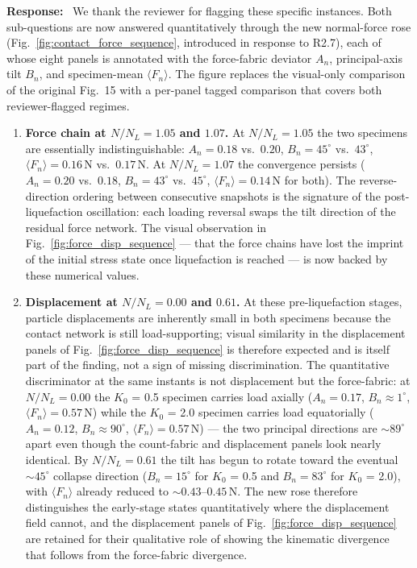 \documentclass[11pt,a4paper]{article}
\newcommand{\response}{\par\noindent\textbf{Response:}\ \ignorespaces}
\newcommand{\Kzero}{\ensuremath{K_0}}
\begin{document}
\response
We thank the reviewer for flagging these specific instances. Both
sub-questions are now answered quantitatively through the new
normal-force rose (Fig.~\ref{fig:contact_force_sequence}, introduced
in response to R2.7), each of whose eight panels is annotated with
the force-fabric deviator
$A_n$, principal-axis tilt $B_n$, and specimen-mean
$\langle F_n\rangle$. The figure replaces the visual-only comparison
of the original Fig.~15 with a per-panel tagged comparison that
covers both reviewer-flagged regimes.

\begin{enumerate}[leftmargin=*,label=(\arabic*),topsep=4pt,itemsep=6pt]
\item \textbf{Force chain at $N/N_L = 1.05$ and $1.07$.}
At $N/N_L = 1.05$ the two specimens are essentially indistinguishable:
$A_n = 0.18$ vs.\ $0.20$, $B_n = 45^\circ$ vs.\ $43^\circ$,
$\langle F_n\rangle = 0.16$\,N vs.\ $0.17$\,N. At $N/N_L = 1.07$ the
convergence persists ($A_n = 0.20$ vs.\ $0.18$, $B_n = 43^\circ$ vs.\
$45^\circ$, $\langle F_n\rangle = 0.14$\,N for both). The reverse-
direction ordering between consecutive snapshots is the signature of
the post-liquefaction oscillation: each loading reversal swaps the
tilt direction of the residual force network. The visual observation
in Fig.~\ref{fig:force_disp_sequence} — that the force chains have
lost the imprint of the initial stress state once liquefaction is
reached — is now backed by these numerical values.

\item \textbf{Displacement at $N/N_L = 0.00$ and $0.61$.}
At these pre-liquefaction stages, particle displacements are
inherently small in both specimens because the contact network is
still load-supporting; visual similarity in the displacement panels
of Fig.~\ref{fig:force_disp_sequence} is therefore expected and is
itself part of the finding, not a sign of missing discrimination. The quantitative
discriminator at the same instants is not displacement but the
force-fabric: at $N/N_L = 0.00$ the \Kzero{} = 0.5 specimen carries
load axially ($A_n = 0.17$, $B_n \approx 1^\circ$,
$\langle F_n\rangle = 0.57$\,N) while the \Kzero{} = 2.0 specimen
carries load equatorially ($A_n = 0.12$, $B_n \approx 90^\circ$,
$\langle F_n\rangle = 0.57$\,N) — the two principal directions are
$\sim\!89^\circ$ apart even though the count-fabric and displacement
panels look nearly identical. By $N/N_L = 0.61$ the tilt has begun to
rotate toward the eventual $\sim\!45^\circ$ collapse direction
($B_n = 15^\circ$ for \Kzero{} = 0.5 and $B_n = 83^\circ$ for
\Kzero{} = 2.0), with $\langle F_n\rangle$ already reduced to
$\sim\!0.43$--$0.45$\,N. The new rose therefore distinguishes the
early-stage states quantitatively where the displacement field cannot,
and the displacement panels of Fig.~\ref{fig:force_disp_sequence} are
retained for their qualitative role of showing the kinematic
divergence that follows from the force-fabric divergence.
\end{enumerate}
\end{document}
